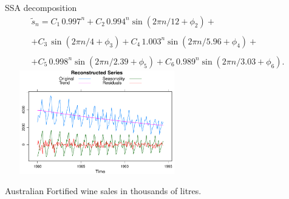 \documentclass[pdf, unicode, ucs, notheorems]{beamer}
\theoremstyle{definition}
\begin{document}
\begin{frame}{SSA decomposition}
  \vspace*{-0.3cm}
  \[
    \begin{array}{l}
      \nonumber
      \widetilde{s}_n=C_1\, 0.997^n+C_2\, 0.994^n\sin(2\pi n/12+\phi_2)+\\  \\ +
      C_3\, \sin(2\pi n/4+\phi_3)+
      C_4\, 1.003^n\sin(2\pi n/5.96+\phi_4)+\\  \\+
      C_5\, 0.998^n\sin(2\pi n/2.39+\phi_5)+
      C_6\, 0.989^n\sin(2\pi n/3.03+\phi_6).
    \end{array}
  \]
  \centering
  \includegraphics[width=8cm, height=4.5cm]{fort_rec}

  Australian Fortified wine sales in thousands of litres.

\end{frame}
\end{document}
